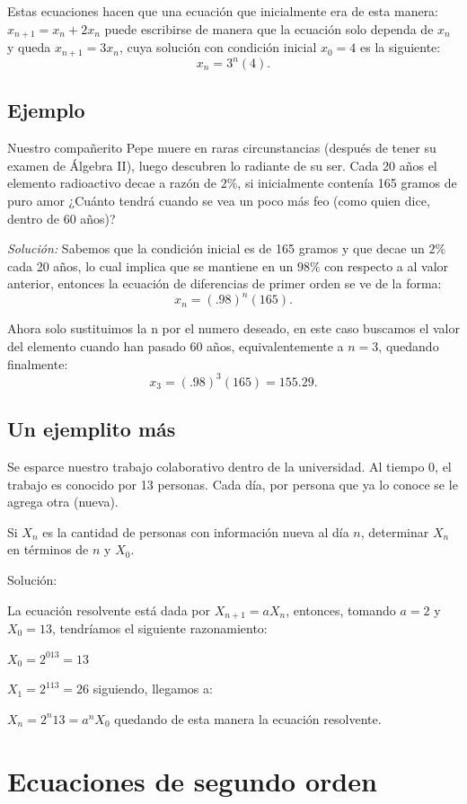 \documentclass{article}
\begin{document}
Estas ecuaciones hacen que una ecuación que inicialmente era de esta
manera: $x_{n+1}=x_n+2x_n$ puede escribirse de manera que la ecuación
solo dependa de $x_n$ y queda $x_{n+1}=3x_n$, cuya solución con
condición inicial $x_0=4$ es la siguiente:
$$x_n=3^n(4).$$

\subsection{Ejemplo}

Nuestro compañerito Pepe muere en raras circunstancias (después de
tener su examen de Álgebra II), luego descubren lo radiante de su
ser. Cada 20 años el elemento radioactivo decae a razón de $2\%$, si
inicialmente contenía 165 gramos de puro amor ¿Cuánto tendrá cuando se
vea un poco más feo (como quien dice, dentro de 60 años)?

\textit{Solución:}  
Sabemos que la condición inicial es de 165 gramos y que decae un $2\%$
cada 20 años, lo cual implica que se mantiene en un $98\%$ con
respecto a al valor anterior, entonces la ecuación de diferencias de
primer orden se ve de la forma:
$$x_{n}=(.98)^n(165).$$

Ahora solo sustituimos la n por el numero deseado, en este caso
buscamos el valor del elemento cuando han pasado 60 años,
equivalentemente a $n=3$, quedando finalmente:
$$x_{3}=(.98)^3(165)= 155.29.$$

\subsection{Un ejemplito más}

Se esparce nuestro trabajo colaborativo dentro de la universidad. Al tiempo 0, el trabajo es conocido por 13 personas. Cada día, por persona que ya lo conoce se le agrega otra (nueva).

Si $X_n$ es la cantidad de personas con información nueva al día $n$, determinar $X_n$ en términos de $n$ y $X_0$.

Solución:

La ecuación resolvente está dada por $X_{n+1}=aX_n$, entonces, tomando $a=2$ y $X_0=13$, tendríamos el siguiente razonamiento:

$X_0=2^013=13$

$X_1=2^113=26$ siguiendo, llegamos a:

$X_n=2^n13=a^nX_0$ quedando de esta manera la ecuación resolvente.

\section{Ecuaciones de segundo orden}
\end{document}
